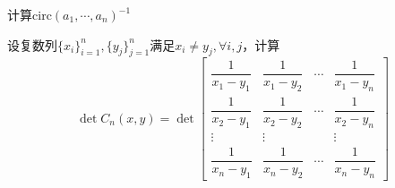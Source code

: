             \begin{exercise}
                计算$\mathrm{circ}(a_1,\cdots,a_n)^{-1}$
            \end{exercise}
    
            \begin{example}[(Cauchy行列式)]
                设复数列$\{x_i\}_{i=1}^n,\{y_j\}_{j=1}^{n}$满足$x_i\neq y_j,\forall i,j$，计算
                \[\det C_n(x,y)=\det\begin{bmatrix}\dfrac{1}{x_1-y_1}&\dfrac{1}{x_1-y_2}&\cdots&\dfrac{1}{x_1-y_n}\\\dfrac{1}{x_2-y_1}&\dfrac{1}{x_2-y_2}&\cdots&\dfrac{1}{x_2-y_n}\\\vdots&\vdots&&\vdots\\\dfrac{1}{x_n-y_1}&\dfrac{1}{x_n-y_2}&\cdots&\dfrac{1}{x_n-y_n}\end{bmatrix}\]
            \end{example}

